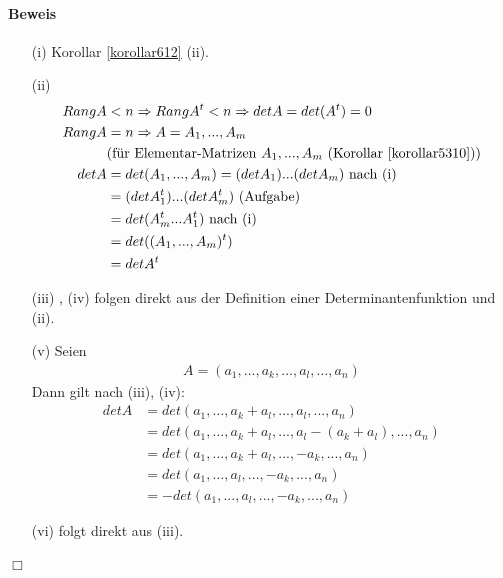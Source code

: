 \documentclass[11pt]{report}
\begin{document}
\paragraph{Beweis}
\begin{itemize}
 \item[(i)] Korollar \ref{korollar612} (ii).
 \item[(ii)]
\begin{align}
Rang A &< n \Rightarrow Rang A^t < n \Rightarrow det A = det(A^t) = 0 \\
Rang A &= n \Rightarrow A = A_1, ..., A_m \\ &\text{(für Elementar-Matrizen $A_1, ..., A_m$ (Korollar \ref{korollar5310}))}\\
det A &= det(A_1, ..., A_m) = (det A_1) ... (det A_m) \text{ nach (i)} \\
&= (det A_1^t)...(det A_m^t) \text{ (Aufgabe)} \\
&= det(A_m^t...A_1^t) \text{ nach (i)} \\
&= det((A_1, ..., A_m)^t) \\
&= det A^t
\end{align}
 \item[(iii)], (iv) folgen direkt aus der Definition einer Determinantenfunktion und (ii).
 \item[(v)] Seien
\begin{align}
A = (a_1, ..., a_k, ..., a_l, ..., a_n)
\end{align}
Dann gilt nach (iii), (iv):
\begin{align}
det A &= det(a_1, ..., a_k+a_l, ..., a_l, ..., a_n) \\
&= det(a_1, ..., a_k+a_l, ..., a_l-(a_k+a_l), ..., a_n) \\
&= det(a_1, ..., a_k+a_l, ..., -a_k, ..., a_n) \\
&= det(a_1, ..., a_l, ..., -a_k, ..., a_n) \\
&= - det(a_1, ..., a_l, ..., -a_k, ..., a_n)
\end{align}

 \item[(vi)] folgt direkt aus (iii).
\end{itemize}
\hspace*{1cm} \hfill $\Box$
\end{document}
